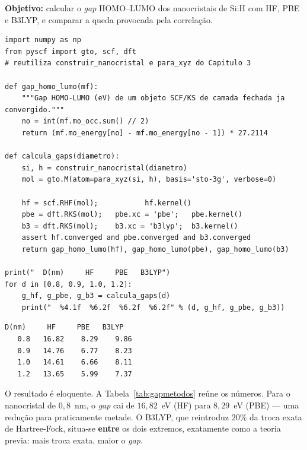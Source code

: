 \begin{caixamaos}
\textbf{Objetivo:} calcular o \emph{gap} HOMO--LUMO dos nanocristais de Si:H com
HF, PBE e B3LYP, e comparar a queda provocada pela correlação.

\begin{lstlisting}[style=python]
import numpy as np
from pyscf import gto, scf, dft
# reutiliza construir_nanocristal e para_xyz do Capitulo 3

def gap_homo_lumo(mf):
    """Gap HOMO-LUMO (eV) de um objeto SCF/KS de camada fechada ja convergido."""
    no = int(mf.mo_occ.sum() // 2)
    return (mf.mo_energy[no] - mf.mo_energy[no - 1]) * 27.2114

def calcula_gaps(diametro):
    si, h = construir_nanocristal(diametro)
    mol = gto.M(atom=para_xyz(si, h), basis='sto-3g', verbose=0)

    hf = scf.RHF(mol);           hf.kernel()
    pbe = dft.RKS(mol);   pbe.xc = 'pbe';   pbe.kernel()
    b3 = dft.RKS(mol);    b3.xc = 'b3lyp';  b3.kernel()
    assert hf.converged and pbe.converged and b3.converged
    return gap_homo_lumo(hf), gap_homo_lumo(pbe), gap_homo_lumo(b3)

print("  D(nm)     HF     PBE   B3LYP")
for d in [0.8, 0.9, 1.0, 1.2]:
    g_hf, g_pbe, g_b3 = calcula_gaps(d)
    print("  %4.1f  %6.2f  %6.2f  %6.2f" % (d, g_hf, g_pbe, g_b3))
\end{lstlisting}

\begin{lstlisting}[style=console]
  D(nm)     HF     PBE   B3LYP
   0.8   16.82    8.29    9.86
   0.9   14.76    6.77    8.23
   1.0   14.61    6.66    8.11
   1.2   13.65    5.99    7.37
\end{lstlisting}
\end{caixamaos}

\noindent
O resultado é eloquente. A Tabela~\ref{tab:gapmetodos} reúne os números. Para o
nanocristal de $0{,}8$~nm, o \emph{gap} cai de $16{,}82$~eV (HF) para $8{,}29$~eV
(PBE) --- uma redução para praticamente metade. O B3LYP, que reintroduz $20\%$ da troca
exata de Hartree-Fock, situa-se \textbf{entre} os dois extremos, exatamente como a
teoria previa: mais troca exata, maior o \emph{gap}.

